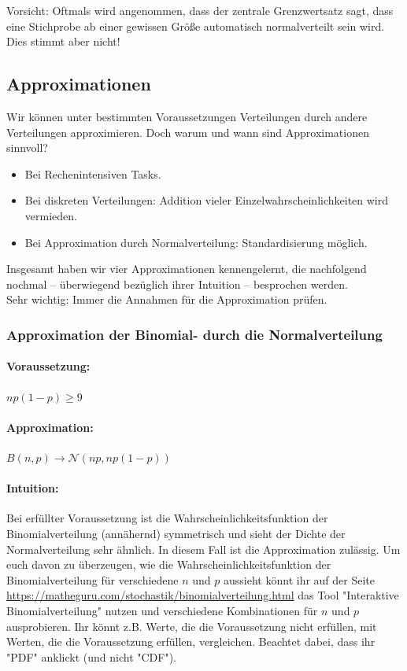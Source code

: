 \documentclass[a4paper]{article}
\newcommand\dangersign{%
 \makebox[1.8em][c]{%
 \makebox[0pt][c]{\raisebox{.15em}{\small!}}%
 \makebox[0pt][c]{\color{red}\Large$\triangle$}}}%
\begin{document}
\noindent \dangersign Vorsicht: Oftmals wird angenommen, dass der zentrale Grenzwertsatz sagt, dass eine Stichprobe ab einer gewissen Größe automatisch normalverteilt sein wird. Dies stimmt aber nicht!


\subsection{Approximationen}\label{sec:Approx}
Wir können unter bestimmten Voraussetzungen Verteilungen durch andere Verteilungen approximieren. Doch warum und wann sind Approximationen sinnvoll?

\begin{itemize}
    \item Bei Rechenintensiven Tasks.
    \item Bei  diskreten Verteilungen: Addition vieler Einzelwahrscheinlichkeiten wird vermieden.
    \item Bei Approximation durch Normalverteilung: Standardisierung möglich.
\end{itemize}

\noindent Insgesamt haben wir vier Approximationen kennengelernt, die nachfolgend nochmal -- überwiegend bezüglich ihrer Intuition -- besprochen werden.\\

\noindent \dangersign Sehr wichtig: Immer die Annahmen für die Approximation prüfen.

\subsubsection{Approximation der Binomial- durch die Normalverteilung}\label{sec:BinN}

\paragraph{Voraussetzung:} $np(1-p) \geq 9$
\paragraph{Approximation:} $B(n,p) \rightarrow \mathcal{N}(np,np(1-p))$
\paragraph{Intuition:} Bei erfüllter Voraussetzung ist die Wahrscheinlichkeitsfunktion der Binomialverteilung (annähernd) symmetrisch und sieht der Dichte der Normalverteilung sehr ähnlich. In diesem Fall ist die Approximation zulässig. Um euch davon zu überzeugen, wie die Wahrscheinlichkeitsfunktion der Binomialverteilung für verschiedene $n$ und $p$ aussieht könnt ihr auf der Seite \url{https://matheguru.com/stochastik/binomialverteilung.html} das Tool "Interaktive Binomialverteilung" nutzen und verschiedene Kombinationen für $n$ und $p$ ausprobieren. Ihr könnt z.B. Werte, die die Voraussetzung nicht erfüllen, mit Werten, die die Voraussetzung erfüllen, vergleichen. Beachtet dabei, dass ihr "PDF" anklickt (und nicht "CDF").
\end{document}
